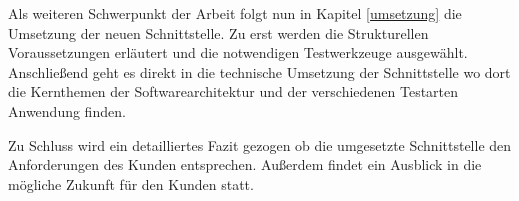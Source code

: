 Als weiteren Schwerpunkt der Arbeit folgt nun in Kapitel \ref{umsetzung} die Umsetzung der neuen Schnittstelle. Zu erst werden die Strukturellen Voraussetzungen erläutert und die notwendigen Testwerkzeuge ausgewählt. Anschließend geht es direkt in die technische Umsetzung der Schnittstelle wo dort die Kernthemen der Softwarearchitektur und der verschiedenen Testarten Anwendung finden.

Zu Schluss wird ein detailliertes Fazit gezogen ob die umgesetzte Schnittstelle den Anforderungen des Kunden entsprechen. Außerdem findet ein Ausblick in die mögliche Zukunft für den Kunden statt.



